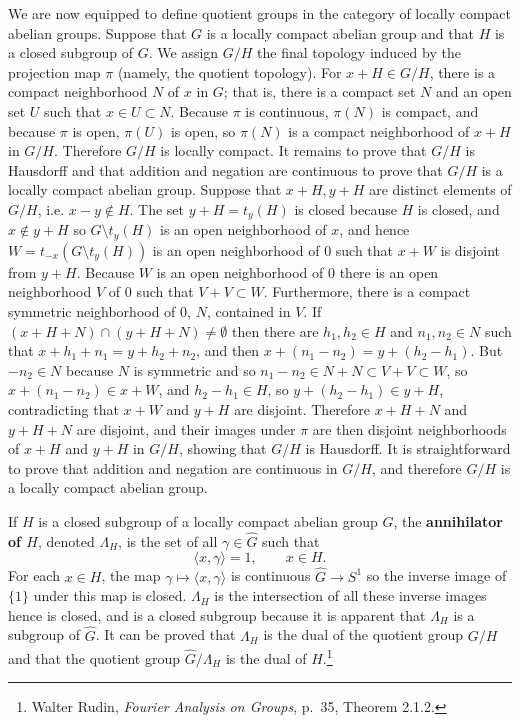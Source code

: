 \documentclass{article}
\newcommand{\inner}[2]{\langle #1, #2 \rangle}
\begin{document}
We are now equipped to define quotient groups in the category of locally compact abelian groups. 
Suppose that $G$ is a locally compact abelian group and that $H$ is a closed subgroup of $G$. 
We assign $G /H$ the final topology induced by the
projection map $\pi$ (namely, the quotient topology).  For  $x+ H \in G/H$, there is a compact neighborhood $N$ of $x$ in $G$; that is,
there is a compact set $N$ and an open set $U$ such that $x \in U \subset N$. Because $\pi$ is continuous, $\pi(N)$ is compact,
and because $\pi$ is open, $\pi(U)$ is open, so $\pi(N)$ is a compact neighborhood of $x+H$ in $G/H$. Therefore $G/H$ is locally compact.
It remains to prove that $G/H$ is Hausdorff and that addition and negation are continuous to prove that $G/H$ is  a locally compact
abelian group. Suppose that $x+H,y+H$ are distinct elements of $G/H$, i.e. $x-y \not \in H$. The set $y+H = t_y(H)$ is closed because $H$ is closed,
and $x \not \in y+H$ so $G \setminus  t_y(H)$ is an open neighborhood of $x$, and hence $W=t_{-x}(G \setminus t_y(H))$ is an open neighborhood of $0$ such that
$x+W$ is disjoint from $y+H$. Because $W$ is an open neighborhood of $0$ there is an open  neighborhood $V$ of $0$ such that $V+V \subset W$. Furthermore,
there is a compact symmetric neighborhood of $0$, $N$, contained in $V$. 
If $(x+H +N) \cap (y+H+N) \neq \emptyset$ then there are $h_1,h_2 \in H$ and $n_1,n_2 \in N$ such that
$x+h_1+n_1 = y+h_2+n_2$, and then $x+(n_1-n_2) = y + (h_2-h_1)$. But $-n_2 \in N$ because $N$ is symmetric and so
$n_1-n_2 \in N + N \subset V+V \subset W$, so $x+(n_1-n_2) \in x+W$,  and $h_2-h_1 \in H$, so $y+(h_2-h_1) \in y+H$, contradicting that $x+W$ and
$y+H$ are disjoint. Therefore $x+H+N$ and $y+H+N$ are disjoint, and their images under $\pi$ are then disjoint neighborhoods of $x+H$ and $y+H$ in $G/H$, showing that
$G/H$ is Hausdorff. It is straightforward to prove that addition and negation are continuous in $G/H$, and therefore $G/H$
is a locally compact abelian group. 

If $H$ is a closed subgroup of a locally compact abelian group $G$, the \textbf{annihilator of $H$}, denoted $\Lambda_H$, is the set
of all $\gamma \in \widehat{G}$ such that
\[
\inner{x}{\gamma}=1, \qquad x \in H.
\]
 For each $x \in H$, the map $\gamma \mapsto \inner{x}{\gamma}$ is continuous
$\widehat{G} \to S^1$ so the inverse image of $\{1\}$ under this map is closed. $\Lambda_H$ is the intersection of all these inverse images hence is closed, and is a closed
subgroup because it is apparent that $\Lambda_H$ is a subgroup of $\widehat{G}$. 
It can be proved that $\Lambda_H$ is the dual of the quotient group $G/H$ and that the quotient group $\widehat{G}/\Lambda_H$ is the dual of
 $H$.\footnote{Walter Rudin, {\em Fourier Analysis on Groups}, p.~35, Theorem 2.1.2.}
\end{document}
